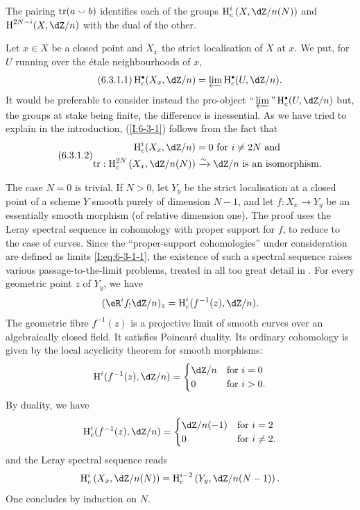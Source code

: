 \begin{theorem}\label{I:6-3-1}
The pairing $\operatorname{tr}(a\smallsmile b)$ identifies each of the groups
$\h_c^i\left(X,\dZ/n(N)\right)$ and $\h^{2 N-i}(X,\dZ/n)$ with the dual of
the other.
\end{theorem}

Let $x\in X$ be a closed point and $X_x$ the strict localisation of $X$ at
$x$. We put, for $U$ running over the \'etale neighbourhoods of $x$,
\begin{equation*}\tag{6.3.1.1}\label{I:eq:6-3-1-1}
  \h_c^\bullet(X_x,\dZ/n) = \varprojlim \h_c^\bullet(U,\dZ/n) \text{.}
\end{equation*}
It would be preferable to consider instead the pro-object
$\text{``}\varprojlim\text{''} \h_c^\bullet(U,\dZ/n)$ but, the groups at stake
being finite, the difference is inessential. As we have tried to
explain in the introduction, (\ref{I:6-3-1}) follows from the fact that
\begin{equation*}\tag{6.3.1.2}\label{I:eq:6-3-1-2}
\begin{aligned}
  \h_c^i(X_x,\dZ/n) &= 0 \text{ for $i\ne 2N$ and } \\
  \tr : \h_c^{2 N}\left(X_x,  \dZ/n(N)\right) &\iso \dZ/n \text{ is an isomorphism.}
\end{aligned}
\end{equation*}

The case $N=0$ is trivial. If $N>0$, let $Y_y$ be the strict localisation at
a closed point of a scheme $Y$ smooth purely of dimension $N-1$, and let
$f:X_x\to Y_y$ be an essentially smooth morphism (of relative dimension
one). The proof uses the Leray spectral sequence in cohomology with
proper support for $f$, to reduce to the case of curves. Since the
``proper-support cohomologies'' under consideration are defined as limits
\eqref{I:eq:6-3-1-1}, the existence of such a spectral sequence raises various
passage-to-the-limit problems, treated in all too great detail in
\cite[XVIII]{sga4}. For every geometric point $z$ of $Y_y$, we have
\[
  (\eR^if_! \dZ/n)_z = \h_c^i(f^{-1}(z),\dZ/n) \text{.}
\]
The geometric fibre $f^{-1}(z)$ is a projective limit of smooth curves
over an algebraically closed field. It satisfies Poincar\'e duality.
Its ordinary cohomology is given by the local acyclicity theorem
for smooth morphisms:
\[
  \h^i(f^{-1}(z),\dZ/n)
    = \begin{cases}
        \dZ/n & \text{for $i=0$} \\
        0     & \text{for $i>0$.}
      \end{cases}
\]
By duality, we have
\[
  \h_c^i(f^{-1}(z),\dZ/n)
    = \begin{cases}
        \dZ/n(-1) & \text{for $i=2$} \\
        0         & \text{for $i\ne 2$.}
      \end{cases}
\]
and the Leray spectral sequence reads
\[
  \h_c^i\left(X_x,\dZ/n(N)\right) = \h_c^{i-2}\left(Y_y,\dZ/n(N-1)\right) \text{.}
\]
One concludes by induction on $N$. 











